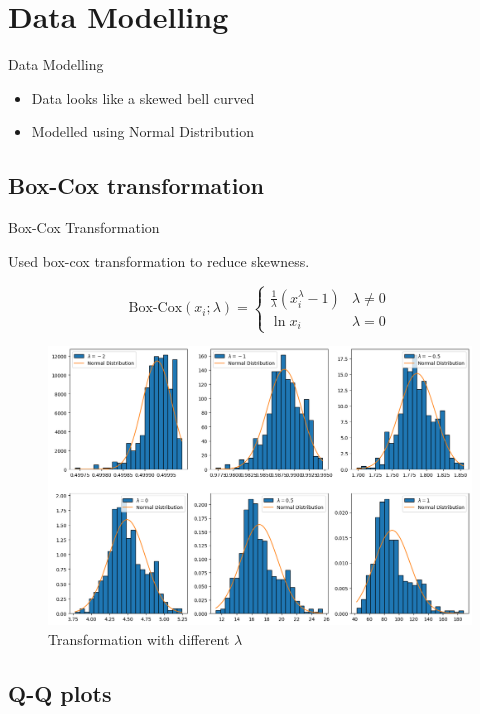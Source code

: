 \section{Data Modelling}

\begin{frame}{Data Modelling}

  \begin{itemize}
    \item Data looks like a skewed bell curved
    \item Modelled using Normal Distribution
  \end{itemize}
  
\end{frame}


\subsection{Box-Cox transformation}

\begin{frame}{Box-Cox Transformation}

  Used box-cox transformation to reduce skewness.

  \[
    \text{Box-Cox}(x_i; \lambda) =
    \begin{cases}
    \frac{1}{\lambda} (x_i ^ \lambda - 1) & \lambda \ne 0 \\
    \ln x_i & \lambda = 0
    \end{cases}
  \]

  \begin{figure}
    \centering
    \includegraphics[width=0.7\linewidth]{../Report/images/transforms.png}
    \caption{Transformation with different $\lambda$}
  \end{figure}
  
\end{frame}


\subsection{Q-Q plots}


